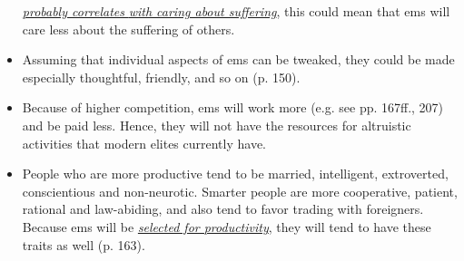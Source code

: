 \documentclass[]{article}
\begin{document}
\begin{itemize}
  \href{http://reducing-suffering.org/how-important-is-experiencing-suffering-for-caring-about-suffering/}{\emph{probably
  correlates} \emph{with caring about suffering}}, this could mean that
  ems will care less about the suffering of others.
\item
  Assuming that individual aspects of ems can be tweaked, they could be
  made especially thoughtful, friendly, and so on (p. 150).
\item
  Because of higher competition, ems will work more (e.g. see pp.
  167ff., 207) and be paid less. Hence, they will not have the resources
  for altruistic activities that modern elites currently have.
\item
  People who are more productive tend to be married, intelligent,
  extroverted, conscientious and non-neurotic. Smarter people are more
  cooperative, patient, rational and law-abiding, and also tend to favor
  trading with foreigners. Because ems will be
  \href{https://casparoesterheld.com/2016/08/30/the-age-of-em-summary-of-policy-relevant-information/\#WhoBecomesEm}{\emph{selected
  for productivity}}, they will tend to have these traits as well (p.
  163).


\end{itemize}
\end{document}
